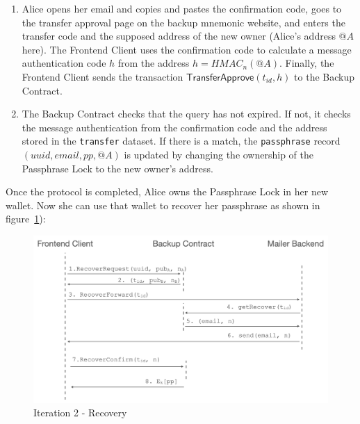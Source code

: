 \documentclass[runningheads]{llncs}
\newcommand{\ms}[1]{\ensuremath{\mathsf{#1}}}
\begin{document}
\begin{enumerate}
\item Alice opens her email and copies and pastes the confirmation code, goes to the transfer approval page on the backup mnemonic website, and enters the transfer code and the supposed address of the new owner (Alice's address $@A$ here). The Frontend Client uses the confirmation code to calculate a message authentication code $h$ from the address $h=HMAC_{n}(@A)$. Finally, the Frontend Client sends the transaction $\ms{TransferApprove}(t_{id}, h)$ to the Backup Contract.
\item The Backup Contract checks that the query has not expired. If not, it checks the message authentication from the confirmation code and the address stored in the {\tt transfer} dataset. If there is a match, the {\tt passphrase} record $(uuid, email, pp, @A)$ is updated by changing the ownership of the Passphrase Lock to the new owner's address.
\end{enumerate}

Once the protocol is completed, Alice owns the Passphrase Lock in her new wallet. Now she can use that wallet to recover her passphrase as shown in figure~\ref{it2:recovery}):

\begin{figure}[t]
  \includegraphics[width=\linewidth]{./media/media-004.png}
  \caption{Iteration 2 - Recovery}
  \label{it2:recovery}
\end{figure}
\end{document}
